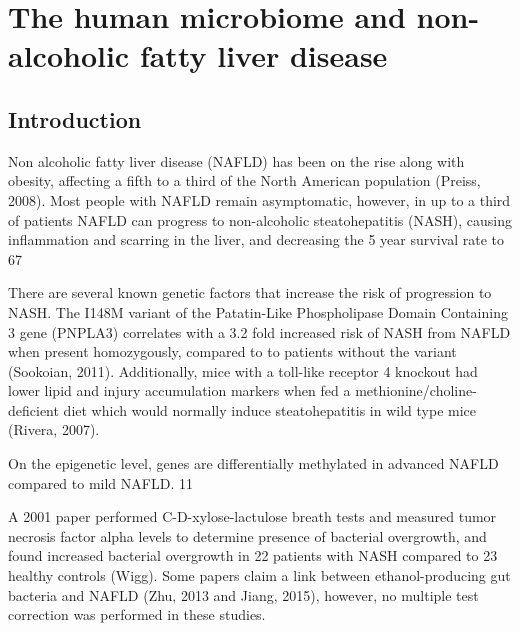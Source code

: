 \chapter{The human microbiome and non-alcoholic fatty liver disease}

\section{Introduction}
Non alcoholic fatty liver disease (NAFLD) has been on the rise along with obesity, affecting a fifth to a third of the North American population (Preiss, 2008). Most people with NAFLD remain asymptomatic, however, in up to a third of patients NAFLD can progress to non-alcoholic steatohepatitis (NASH), causing inflammation and scarring in the liver, and decreasing the 5 year survival rate to 67%

There are several known genetic factors that increase the risk of progression to NASH. The I148M variant of the Patatin-Like Phospholipase Domain Containing 3 gene (PNPLA3) correlates with a 3.2 fold increased risk of NASH from NAFLD when present homozygously, compared to to patients without the variant (Sookoian, 2011). Additionally, mice with a toll-like receptor 4 knockout had lower lipid and injury accumulation markers when fed a methionine/choline-deficient diet which would normally induce steatohepatitis in wild type mice (Rivera, 2007).

On the epigenetic level, genes are differentially methylated in advanced NAFLD compared to mild NAFLD. 11%

A 2001 paper performed C-D-xylose-lactulose breath tests and measured tumor necrosis factor alpha levels to determine presence of bacterial overgrowth, and found increased bacterial overgrowth in 22 patients with NASH compared to 23 healthy controls (Wigg). Some papers claim a link between ethanol-producing gut bacteria and NAFLD (Zhu, 2013 and Jiang, 2015), however, no multiple test correction was performed in these studies.

